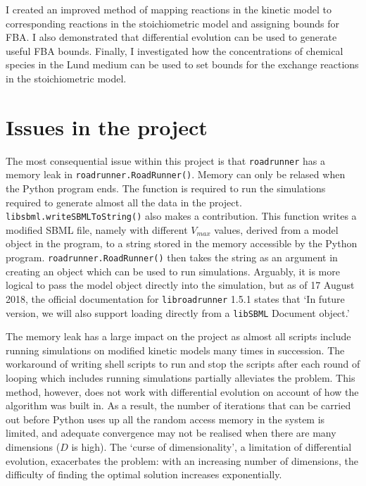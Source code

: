 \documentclass[parskip=full]{scrreprt}
\begin{document}
I created an improved method of mapping reactions in the kinetic model to corresponding reactions in the stoichiometric model and assigning bounds for FBA. I also demonstrated that differential evolution can be used to generate useful FBA bounds. Finally, I investigated how the concentrations of chemical species in the Lund medium can be used to set bounds for the exchange reactions in the stoichiometric model.

\section{Issues in the project}
\label{sec:issues}

The most consequential issue within this project is that \texttt{roadrunner} has a memory leak in \texttt{roadrunner.RoadRunner()}. Memory can only be relased when the Python program ends. The function is required to run the simulations required to generate almost all the data in the project. \texttt{libsbml.writeSBMLToString()} also makes a contribution. This function writes a modified SBML file, namely with different $V_{max}$ values, derived from a model object in the program, to a string stored in the memory accessible by the Python program. \texttt{roadrunner.RoadRunner()} then takes the string as an argument in creating an object which can be used to run simulations. Arguably, it is more logical to pass the model object directly into the simulation, but as of 17 August 2018, the official documentation for \texttt{libroadrunner} 1.5.1 states that `In future version, we will also support loading directly from a \texttt{libSBML} Document object.'

The memory leak has a large impact on the project as almost all scripts include running simulations on modified kinetic models many times in succession. The workaround of writing shell scripts to run and stop the scripts after each round of looping which includes running simulations partially alleviates the problem. This method, however, does not work with differential evolution on account of how the algorithm was built in. As a result, the number of iterations that can be carried out before Python uses up all the random access memory in the system is limited, and adequate convergence may not be realised when there are many dimensions ($D$ is high). The `curse of dimensionality', a limitation of differential evolution, exacerbates the problem: with an increasing number of dimensions, the difficulty of finding the optimal solution increases exponentially.
\end{document}
